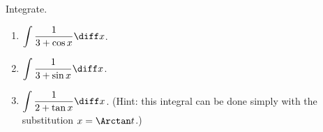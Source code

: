 Integrate.
\begin{enumerate}[ref={\fcProblemRef}]
\item \label{problemInt1/(3+cos x)dx} $\displaystyle \int \frac{1}{3+\cos x}\diff x$.

\item $\displaystyle \int \frac{1}{3+\sin x}\diff x$.

\item \label{problemInt1/(2+tan x)dx}$\displaystyle \int \frac{1}{2+\tan x}\diff x$.  (Hint: this integral can be done simply with the substitution $x=\Arctan t$.)

\end{enumerate}